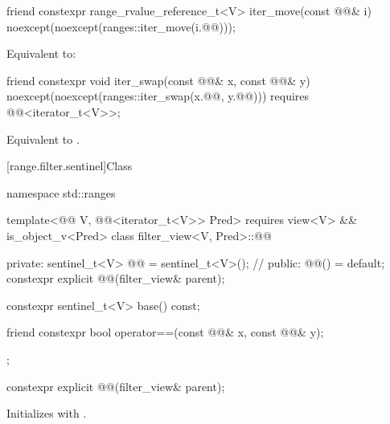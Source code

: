 %
\begin{itemdecl}
friend constexpr range_rvalue_reference_t<V> iter_move(const @@& i)
  noexcept(noexcept(ranges::iter_move(i.@@)));
\end{itemdecl}

\begin{itemdescr}
\pnum
\effects
Equivalent to: 
\end{itemdescr}

%
\begin{itemdecl}
friend constexpr void iter_swap(const @@& x, const @@& y)
  noexcept(noexcept(ranges::iter_swap(x.@@, y.@@)))
  requires @@<iterator_t<V>>;
\end{itemdecl}

\begin{itemdescr}
\pnum
\effects
Equivalent to .
\end{itemdescr}

[range.filter.sentinel]{Class }

%
\begin{codeblock}
namespace std::ranges {
  template<@@ V, @@<iterator_t<V>> Pred>
    requires view<V> && is_object_v<Pred>
  class filter_view<V, Pred>::@@ {
  private:
    sentinel_t<V> @@ = sentinel_t<V>();       // \expos
  public:
    @@() = default;
    constexpr explicit @@(filter_view& parent);

    constexpr sentinel_t<V> base() const;

    friend constexpr bool operator==(const @@& x, const @@& y);
  };
}
\end{codeblock}

%
\begin{itemdecl}
constexpr explicit @@(filter_view& parent);
\end{itemdecl}

\begin{itemdescr}
\pnum
\effects
Initializes  with .
\end{itemdescr}

